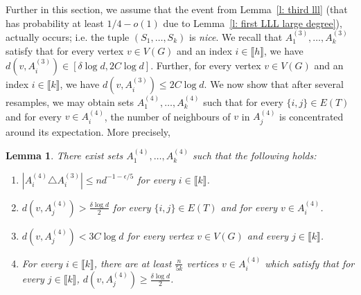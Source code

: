 \documentclass[notitlepage]{scrartcl}
\newcommand{\br}[1]{\llbracket{#1}\rrbracket}
\newtheorem{lemma}[thm]{Lemma}
\begin{document}
Further in this section, we assume that the event from Lemma~\ref{l: third lll} (that has probability at least $1/4-o(1)$ due to Lemma~\ref{l: first LLL large degree}), actually occurs; i.e. the tuple $(S_1,\ldots,S_k)$ is \emph{nice}. %
 We recall that $A_1^{(3)},\ldots, A_k^{(3)}$ satisfy that for every vertex $v \in V(G)$ and an index $i \in \br{h}$, we have $d(v, A_i^{(3)}) \in [\delta \log d, 2C \log d]$. Further, for every vertex $v \in V(G)$ and an index $i\in \br{k}$, we have $d(v, A_i^{(3)}) \le 2C \log d$. We now show that after several resamples, we may obtain sets $A_1^{(4)}, \ldots, A_k^{(4)}$ such that for every $\{i, j\} \in E(T)$ and for every $v \in A_i^{(4)}$, the number of neighbours of $v$ in $A_j^{(4)}$ is concentrated around its expectation. More precisely, 
\begin{lemma}\label{l: no b}
There exist sets $A_1^{(4)}, \dots, A_k^{(4)}$ such that the following holds:
    \begin{enumerate}
        \item $\left|A_i^{(4)}\triangle A_i^{(3)}\right|\le nd^{-1-\epsilon/5}$ for every $i\in \br{k}$.\label{l: no b item}
        \item $d(v, A_j^{(4)}) > \frac{\delta \log d}{2}$ for every $\{i,j\} \in E(T)$ and for every $v \in A_i^{(4)}$.
        \item $d(v, A_j^{(4)}) < 3C \log d$ for every vertex $v \in V(G)$ and every $j \in \br{k}$.
        \item For every $i\in \br{k}$, there are at least $\frac{n}{5k}$ vertices $v\in A_i^{(4)}$ which satisfy that for every $j\in \br{k}$, $d(v,A_j^{(4)})\ge \frac{\delta\log d}{2}$. 
    \end{enumerate}
\end{lemma}
\end{document}
